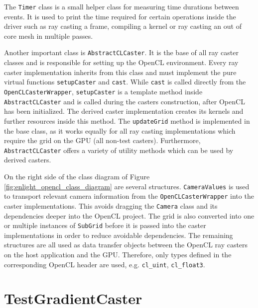 The \lstinline!Timer! class is a small helper class for measuring time durations between events. It is used to print the time required for certain operations inside the driver such as ray casting a frame, compiling a kernel or ray casting an out of core mesh in multiple passes.

Another important class is \lstinline!AbstractCLCaster!. It is the base of all ray caster classes and is responsible for setting up the OpenCL environment. Every ray caster implementation inherits from this class and must implement the pure virtual functions \lstinline!setupCaster! and \lstinline!cast!. While \lstinline!cast! is called directly from the \lstinline!OpenCLCasterWrapper!, \lstinline!setupCaster! is a template method inside \lstinline!AbstractCLCaster! and is called during the casters construction, after OpenCL has been initialized. The derived caster implementation creates its kernels and further resources inside this method. The \lstinline!updateGrid! method is implemented in the base class, as it works equally for all ray casting implementations which require the grid on the GPU (all non-test casters). Furthermore, \lstinline!AbstractCLCaster! offers a variety of utility methods which can be used by derived casters.

On the right side of the class diagram of Figure \ref{fig:enlight_opencl_class_diagram} are several structures. \lstinline!CameraValues! is used to transport relevant camera information from the \lstinline!OpenCLCasterWrapper! into the caster implementations. This avoids dragging the \lstinline!Camera! class and its dependencies deeper into the OpenCL project. The grid is also converted into one or multiple instances of \lstinline!SubGrid! before it is passed into the caster implementations in order to reduce avoidable dependencies. The remaining structures are all used as data transfer objects between the OpenCL ray casters on the host application and the GPU. Therefore, only types defined in the corresponding OpenCL header are used, e.g. \lstinline!cl_uint!, \lstinline!cl_float3!. 


\section{TestGradientCaster}

